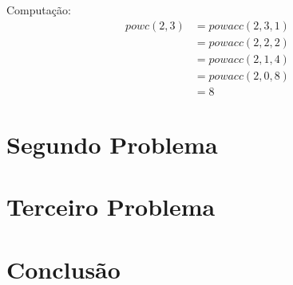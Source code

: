 \documentclass{article}
\begin{document}
Computação:\\
\begin{align*}
powc(2, 3) &= powacc(2, 3, 1)\\
&= powacc(2, 2, 2)\\
&= powacc(2, 1, 4)\\
&= powacc(2, 0, 8)\\
&= 8
\end{align*}

\section{Segundo Problema}
\section{Terceiro Problema}
\section{Conclusão}
\end{document}
